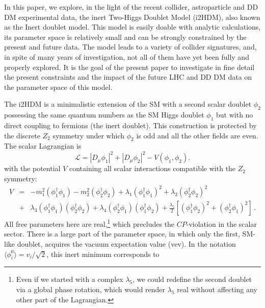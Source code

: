\documentclass[12pt,a4paper]{article}
\begin{document}
In this paper, we explore, in the light of the recent collider, astroparticle and DD DM experimental  data, 
the inert Two-Higgs Doublet Model (i2HDM), also known as the Inert doublet model.
This model is easily doable with analytic calculations, its parameter space is relatively small and can be strongly 
constrained by the present and future data.
The model leads to a variety of collider signatures, and, in spite of many years of investigation, not all of them have yet been fully and properly explored.
It is the goal of the present paper to investigate in fine detail the present constraints and the impact of the future LHC 
and DD DM data on the parameter space of this model.


The i2HDM \cite{Deshpande:1977rw,Ma:2006km,Barbieri:2006dq,LopezHonorez:2006gr} is a minimalistic extension of the SM 
with a second scalar doublet $\phi_2$ possessing the same quantum numbers as the SM Higgs doublet $\phi_1$
but with no direct coupling to fermions (the inert doublet). 
This construction is protected by the discrete $Z_2$ symmetry under which $\phi_2$ is odd and all the other fields are even. 
The scalar Lagrangian is
  \begin{equation}
  \mathcal{L} = |D_{\mu}\phi_1|^2 + |D_{\mu}\phi_2|^2 -V(\phi_1,\phi_2)
  \textrm{.}
  \end{equation}
with the potential $V$ containing all scalar interactions compatible with the $Z_2$ symmetry:
\begin{eqnarray}
  V &=& -m_1^2 (\phi_1^{\dagger}\phi_1) - m_2^2 (\phi_2^{\dagger}\phi_2) + \lambda_1 (\phi_1^{\dagger}\phi_1)^2 + \lambda_2 (\phi_2^{\dagger}\phi_2)^2    \nonumber  \\
  &+&  \lambda_3(\phi_1^{\dagger}\phi_1)(\phi_2^{\dagger}\phi_2) 
  + \lambda_4(\phi_2^{\dagger}\phi_1)(\phi_1^{\dagger}\phi_2) 
  + \frac{\lambda_5}{2}\left[(\phi_1^{\dagger}\phi_2)^2 + (\phi_2^{\dagger}\phi_1)^2 \right]\,.\label{potential}
\end{eqnarray}
All free parameters here are real,\footnote{Even if we started with a complex $\lambda_5$, 
we could redefine the second doublet via a global phase rotation, which would render $\lambda_5$ real
without affecting any other part of the Lagrangian.} which precludes the $CP$-violation in the scalar sector.
There is a large part of the parameter space, in which only the first, SM-like doublet, 
acquires the vacuum expectation value (vev).
In the notation $\langle\phi_i^0\rangle = v_i/\sqrt{2}$, this inert minimum corresponds to
\end{document}
